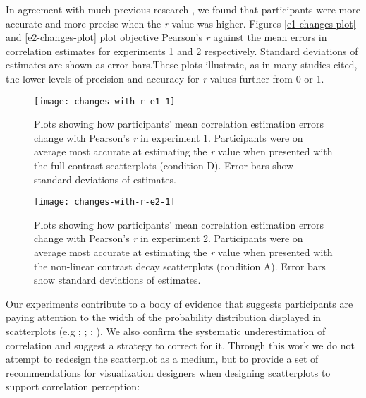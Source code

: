 \documentclass[preprint, 3p,
authoryear]{elsarticle} %
\begin{document}
In agreement with much previous research
\citep{rensink_2010, rensink_2012, rensink_2014, rensink_2017, pollack_1960},
we found that participants were more accurate and more precise when the
\emph{r} value was higher. Figures \ref{e1-changes-plot} and
\ref{e2-changes-plot} plot objective Pearson's \emph{r} against the mean
errors in correlation estimates for experiments 1 and 2 respectively.
Standard deviations of estimates are shown as error bars.These plots
illustrate, as in many studies cited, the lower levels of precision and
accuracy for \emph{r} values further from 0 or 1.

\begin{figure}

{\centering \texttt{[image: changes-with-r-e1-1]} 

}

\caption{\label{e1-changes-plot}Plots showing how participants' mean correlation estimation errors change with Pearson's \textit{r} in experiment 1. Participants were on average most accurate at estimating the \textit{r} value when presented with the full contrast scatterplots (condition D). Error bars show standard deviations of estimates.}\label{fig:changes-with-r-e1}
\end{figure}

\begin{figure}

{\centering \texttt{[image: changes-with-r-e2-1]} 

}

\caption{\label{e2-changes-plot}Plots showing how participants' mean correlation estimation errors change with Pearson's \textit{r} in experiment 2. Participants were on average most accurate at estimating the \textit{r} value when presented with the non-linear contrast decay scatterplots (condition A). Error bars show standard deviations of estimates.}\label{fig:changes-with-r-e2}
\end{figure}

Our experiments contribute to a body of evidence that suggests
participants are paying attention to the width of the probability
distribution displayed in scatterplots (e.g \citealp{cleveland_1982};
\citealp{meyer_1997}; \citealp{yang_2019}; \citealp{rensink_2017}). We
also confirm the systematic underestimation of correlation and suggest a
strategy to correct for it. Through this work we do not attempt to
redesign the scatterplot as a medium, but to provide a set of
recommendations for visualization designers when designing scatterplots
to support correlation perception:
\end{document}
